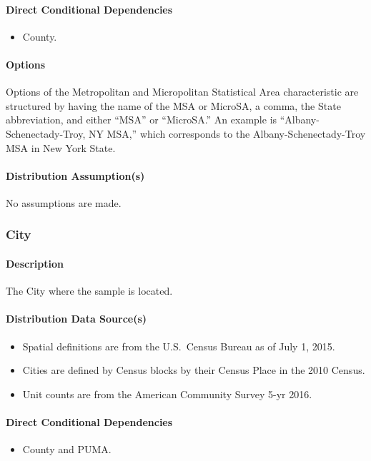 \paragraph{Direct Conditional Dependencies}
\begin{itemize}
    \item County.
\end{itemize}

\paragraph{Options}
Options of the Metropolitan and Micropolitan Statistical Area characteristic are structured by having the name of the MSA or MicroSA, a comma, the State abbreviation, and either ``MSA'' or ``MicroSA.'' An example is ``Albany-Schenectady-Troy, NY MSA,'' which corresponds to the Albany-Schenectady-Troy MSA in New York State.

\paragraph{Distribution Assumption(s)}
No assumptions are made.

\subsubsection{City}
\paragraph{Description}
The City where the sample is located.

\paragraph{Distribution Data Source(s)}
\begin{itemize}
 
\item
  Spatial definitions are from the U.S.~Census Bureau as of July 1,
  2015.
\item
  Cities are defined by Census blocks by their Census Place in the 2010
  Census.
\item
  Unit counts are from the American Community Survey 5-yr 2016.
\end{itemize}

\paragraph{Direct Conditional Dependencies}
\begin{itemize}
    \item County and PUMA.
\end{itemize}

